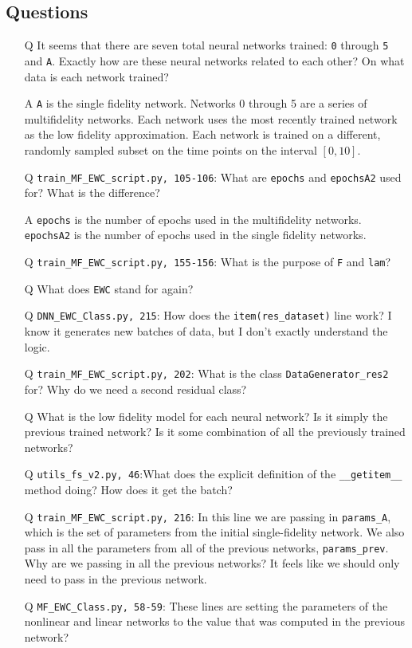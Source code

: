 \documentclass{article}
\begin{document}
\subsection*{Questions}
\begin{itemize}
	\item[Q] It seems that there are seven total neural networks trained: \verb|0| through \verb|5| and \verb|A|. Exactly how are these neural networks related to each other? On what data is each network trained?
	\item[A] \verb|A| is the single fidelity network. Networks 0 through 5 are a series of multifidelity networks. Each network uses the most recently trained network as the low fidelity approximation. Each network is trained on a different, randomly sampled subset on the time points on the interval $[0,10]$. 
	\item[Q] \verb|train_MF_EWC_script.py, 105-106|: What are \verb|epochs| and \verb|epochsA2| used for? What is the difference?
	\item[A] \verb|epochs| is the number of epochs used in the multifidelity networks. \verb|epochsA2| is the number of epochs used in the single fidelity networks.
	\item[Q] \verb|train_MF_EWC_script.py, 155-156|: What is the purpose of \verb|F| and \verb|lam|?
	\item[Q] What does \verb|EWC| stand for again?
	\item[Q] \verb|DNN_EWC_Class.py, 215|: How does the \verb|item(res_dataset)| line work? I know it generates new batches of data, but I don't exactly understand the logic.
	\item[Q] \verb|train_MF_EWC_script.py, 202|: What is the class \verb|DataGenerator_res2| for? Why do we need a second residual class?
	\item[Q] What is the low fidelity model for each neural network? Is it simply the previous trained network? Is it some combination of all the previously trained networks?
	\item[Q] \verb|utils_fs_v2.py, 46|:What does the explicit definition of the \verb|__getitem__| method doing? How does it get the batch?
	\item[Q] \verb|train_MF_EWC_script.py, 216|: In this line we are passing in \verb|params_A|, which is the set of parameters from the initial single-fidelity network. We also pass in all the parameters from all of the previous networks, \verb|params_prev|. Why are we passing in all the previous networks? It feels like we should only need to pass in the previous network.
	\item[Q] \verb|MF_EWC_Class.py, 58-59|: These lines are setting the parameters of the nonlinear and linear networks to the value that was computed in the previous network?
	
\end{itemize}
\end{document}
